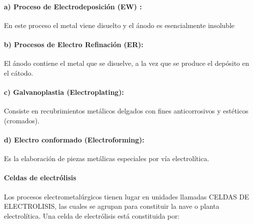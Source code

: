 \paragraph{a)  Proceso de Electrodeposici\'on (EW) :}
En este proceso el metal viene disuelto y el \'anodo es esencialmente insoluble

\paragraph{b)  Procesos de Electro Refinaci\'on (ER):}
El \'anodo contiene el metal que se disuelve, a la vez que se produce el dep\'osito en el c\'atodo.

\paragraph{c)  Galvanoplastia (Electroplating):}
Consiste en recubrimientos met\'alicos delgados con fines anticorrosivos y est\'eticos (cromados).

\paragraph{d)  Electro conformado  (Electroforming):}
Es la elaboraci\'on de piezas met\'alicas especiales por v\'ia electrol\'itica.

\paragraph{Celdas de electr\'olisis}

Los procesos electrometal\'urgicos tienen lugar en unidades llamadas CELDAS DE ELECTROLISIS, las cuales se agrupan para constituir la nave o planta electrol\'itica. Una celda de electr\'olisis est\'a constituida por:

